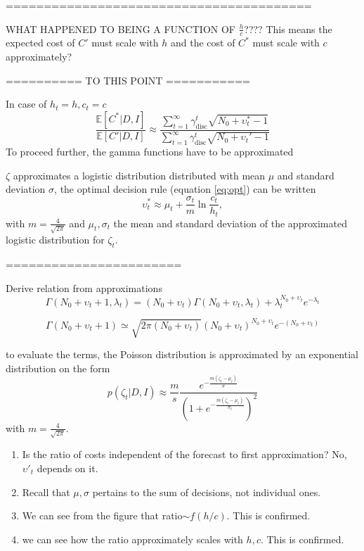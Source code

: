 ========================================


WHAT HAPPENED TO BEING A FUNCTION OF $\frac{h}{c}$???? This means the expected cost of $C'$ must scale with $h$ and the cost of $C^*$ must scale with $c$ approximately?

========== TO THIS POINT ===========

In case of $h_t=h,c_t=c$
\begin{equation}
	\frac{\mathbb{E}[C^*|D,I]}{\mathbb{E}[C'|D,I]} \approx \frac{\sum_{t=1}^{\infty}\gamma_{\text{disc}}^{t} \sqrt{N_0+\upsilon_t^*-1}}{\sum_{t=1}^{\infty}\gamma_{\text{disc}}^{t} \sqrt{N_0+\upsilon_t'-1}}
\end{equation}
To proceed further, the gamma functions have to be approximated

$\zeta$ approximates a logistic distribution distributed with mean $\mu$ and standard deviation $\sigma$, the optimal decision rule (equation \eqref{eq:opt}) can be written~\citep{bartmann1992inventory}
\begin{equation}
	\upsilon_t^* \approx \mu_t+\frac{\sigma_t}{m}\ln\frac{c_t}{h_t},
\end{equation}
with $m= \frac{4}{\sqrt{2\pi}}$ and $\mu_t,\sigma_t$ the mean and standard deviation of the approximated logistic distribution for $\zeta_t$.


=======================

Derive relation from approximations
\begin{equation}
	\Gamma(N_0+\upsilon_t+1,\lambda_t) = (N_0+\upsilon_t)\Gamma(N_0+\upsilon_t,\lambda_t)+\lambda_t^{N_0+\upsilon_t}e^{-\lambda_t}
\end{equation}

\begin{equation}
	\Gamma(N_0+\upsilon_t+1)\simeq \sqrt{2\pi (N_0+\upsilon_t)}(N_0+\upsilon_t)^{N_0+\upsilon_t}e^{-(N_0+\upsilon_t)}
\end{equation}









to evaluate the terms, the Poisson distribution is approximated by an exponential distribution on the form~\citep{}
\begin{equation}
	p(\zeta_t| D, I)\approx \frac{m}{s}\frac{e^{-\frac{m(\zeta_t-\mu_t)}{\sigma}}}{(1+e^{-\frac{m(\zeta_t-\mu_t)}{\sigma_t}})^2}
\end{equation}
with $m=\frac{4}{\sqrt{2\pi}}$.


\begin{enumerate}
	\item Is the ratio of costs independent of the forecast to first approximation? No, $\upsilon'_t$ depends on it.
	\item Recall that $\mu,\sigma $ pertains to the sum of decisions, not individual ones.
	\item We can see from the figure that ratio$\sim f(h/c)$. This is confirmed.
	\item we can see how the ratio approximately scales with $h,c$. This is confirmed.
\end{enumerate}